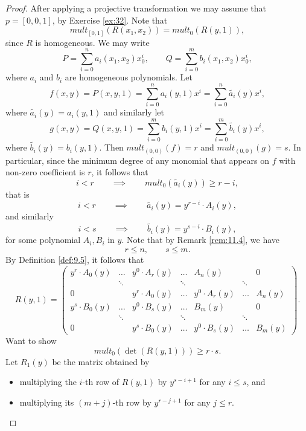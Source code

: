\documentclass{article}
\newcommand{\rb}[1]{\left( #1 \right)}
\renewcommand{\sb}[1]{\left[ #1 \right]}
\theoremstyle{definition}\newtheorem{definition}{Definition}[section]
\theoremstyle{definition}\newtheorem{notation}[definition]{Notation}
\theoremstyle{definition}\newtheorem{remark}[definition]{Remark}
\theoremstyle{definition}\newtheorem{example1}[definition]{Example}
\theoremstyle{definition}\newtheorem{fact}{Fact}
\theoremstyle{definition}\newtheorem{exercise}{Exercise}
\theoremstyle{definition}\newtheorem*{example2}{Example}
\begin{document}
\begin{proof}
After applying a projective transformation we may assume that $ p = \sb{0, 0, 1} $, by Exercise \ref{ex:32}. Note that
$$ mult_{\sb{0, 1}}\rb{R\rb{x_1, x_2}} = mult_0\rb{R\rb{y, 1}}, $$
since $ R $ is homogeneous. We may write
$$ P = \sum_{i = 0}^n a_i\rb{x_1, x_2}x_0^i, \qquad Q = \sum_{i = 0}^m b_i\rb{x_1, x_2}x_0^i, $$
where $ a_i $ and $ b_i $ are homogeneous polynomials. Let
$$ f\rb{x, y} = P\rb{x, y, 1} = \sum_{i = 0}^n a_i\rb{y, 1}x^i = \sum_{i = 0}^n \widetilde{a_i}\rb{y}x^i, $$
where $ \widetilde{a_i}\rb{y} = a_i\rb{y, 1} $ and similarly let
$$ g\rb{x, y} = Q\rb{x, y, 1} = \sum_{i = 0}^m b_i\rb{y, 1}x^i = \sum_{i = 0}^m \widetilde{b_i}\rb{y}x^i, $$
where $ \widetilde{b_i}\rb{y} = b_i\rb{y, 1} $. Then $ mult_{\rb{0, 0}}\rb{f} = r $ and $ mult_{\rb{0, 0}}\rb{g} = s $. In particular, since the minimum degree of any monomial that appears on $ f $ with non-zero coefficient is $ r $, it follows that
$$ i < r \qquad \implies \qquad mult_0\rb{\widetilde{a_i}\rb{y}} \ge r - i, $$
that is
$$ i < r \qquad \implies \qquad \widetilde{a_i}\rb{y} = y^{r - i} \cdot A_i\rb{y}, $$
and similarly
$$ i < s \qquad \implies \qquad \widetilde{b_i}\rb{y} = y^{s - i} \cdot B_i\rb{y}, $$
for some polynomial $ A_i, B_i $ in $ y $. Note that by Remark \ref{rem:11.4}, we have
$$ r \le n, \qquad s \le m. $$
By Definition \ref{def:9.5}, it follows that
$$ R\rb{y, 1} = \begin{pmatrix}
y^r \cdot A_0\rb{y} & \dots & y^0 \cdot A_r\rb{y} & \dots & A_n\rb{y} & & 0 \\
& \ddots & & \ddots & & \ddots & \\
0 & & y^r \cdot A_0\rb{y} & \dots & y^0 \cdot A_r\rb{y} & \dots & A_n\rb{y} \\
y^s \cdot B_0\rb{y} & \dots & y^0 \cdot B_s\rb{y} & \dots & B_m\rb{y} & & 0 \\
& \ddots & & \ddots & & \ddots & \\
0 & & y^s \cdot B_0\rb{y} & \dots & y^0 \cdot B_s\rb{y} & \dots & B_m\rb{y}
\end{pmatrix}. $$
Want to show
$$ mult_0\rb{\det\rb{R\rb{y, 1}}} \ge r \cdot s. $$
Let $ R_1\rb{y} $ be the matrix obtained by
\begin{itemize}
\item multiplying the $ i $-th row of $ R\rb{y, 1} $ by $ y^{s - i + 1} $ for any $ i \le s $, and
\item multiplying its $ \rb{m + j} $-th row by $ y^{r - j + 1} $ for any $ j \le r $.
\end{itemize}

\end{proof}
\end{document}
